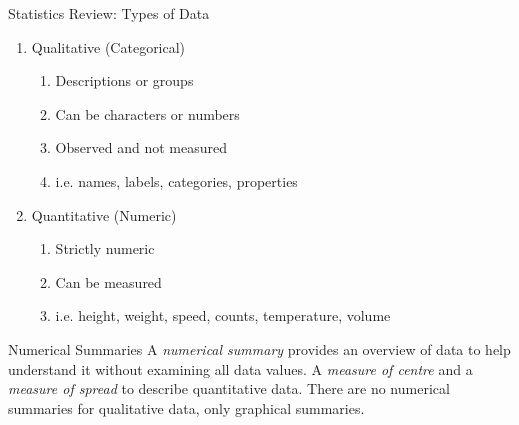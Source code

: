 \documentclass[xcolor=svgnames, 10pt]{beamer}
\begin{document}
\begin{frame}[fragile]{Statistics Review: Types of Data}
\begin{enumerate}
  \item Qualitative (Categorical)
    \begin{enumerate}
      \item Descriptions or groups
      \item Can be characters or numbers
      \item Observed and not measured
      \item i.e. names, labels, categories, properties
    \end{enumerate}
%
  \item Quantitative (Numeric)
    \begin{enumerate}
      \item Strictly numeric
      \item Can be measured
      \item i.e. height, weight, speed, counts, temperature, volume
    \end{enumerate}
\end{enumerate}
\end{frame}


\begin{frame}[fragile]{Numerical Summaries}
\vfill
A \emph{numerical summary} provides an overview of data to help understand it without examining all data values.
\vfill
A \emph{measure of centre} and a \emph{measure of spread} to describe quantitative data. There are no numerical summaries for qualitative data, only graphical summaries. 
\vfill
\end{frame}
\end{document}

